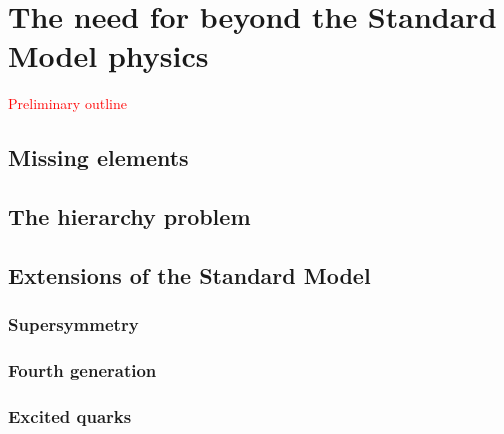 \chapter{The need for beyond the Standard Model physics \label{chap:beyond_standard_model}}

\textcolor{red}{Preliminary outline}

\section{Missing elements \label{sec:missing_elements}}

\section{The hierarchy problem \label{sec:hierarchy_problem}}

\section{Extensions of the Standard Model \label{sec:extensions_standard_model}}

\subsection{Supersymmetry \label{sec:supersymmetry}}


\subsection{Fourth generation \label{sec:fourth_generation}}

\subsection{Excited quarks \label{sec:excited_quarks}}
